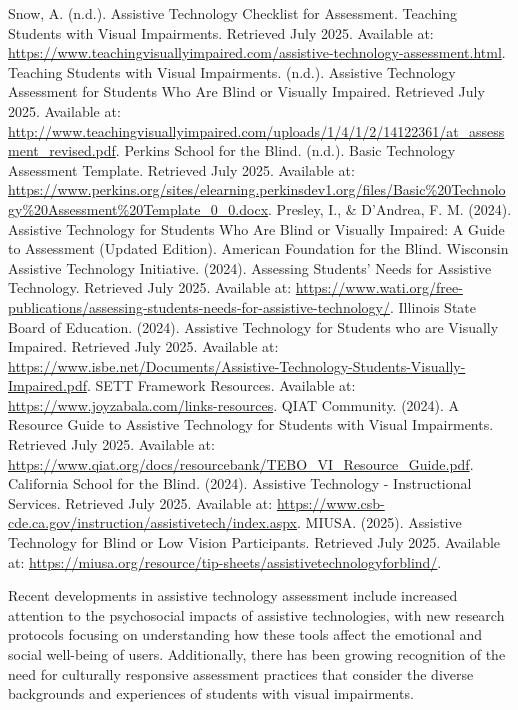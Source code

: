 \begin{thebibliography}{99}
 Snow, A. (n.d.). Assistive Technology Checklist for Assessment. Teaching Students with Visual Impairments. Retrieved July 2025. Available at: \url{https://www.teachingvisuallyimpaired.com/assistive-technology-assessment.html}.
 Teaching Students with Visual Impairments. (n.d.). Assistive Technology Assessment for Students Who Are Blind or Visually Impaired. Retrieved July 2025. Available at: \url{http://www.teachingvisuallyimpaired.com/uploads/1/4/1/2/14122361/at_assessment_revised.pdf}.
 Perkins School for the Blind. (n.d.). Basic Technology Assessment Template. Retrieved July 2025. Available at: \url{https://www.perkins.org/sites/elearning.perkinsdev1.org/files/Basic\%20Technology\%20Assessment\%20Template\_0\_0.docx}.
 Presley, I., \& D'Andrea, F. M. (2024). Assistive Technology for Students Who Are Blind or Visually Impaired: A Guide to Assessment (Updated Edition). American Foundation for the Blind.
 Wisconsin Assistive Technology Initiative. (2024). Assessing Students' Needs for Assistive Technology. Retrieved July 2025. Available at: \url{https://www.wati.org/free-publications/assessing-students-needs-for-assistive-technology/}.
 Illinois State Board of Education. (2024). Assistive Technology for Students who are Visually Impaired. Retrieved July 2025. Available at: \url{https://www.isbe.net/Documents/Assistive-Technology-Students-Visually-Impaired.pdf}.
 SETT Framework Resources. Available at: \url{https://www.joyzabala.com/links-resources}.
 QIAT Community. (2024). A Resource Guide to Assistive Technology for Students with Visual Impairments. Retrieved July 2025. Available at: \url{https://www.qiat.org/docs/resourcebank/TEBO_VI_Resource_Guide.pdf}.
 California School for the Blind. (2024). Assistive Technology - Instructional Services. Retrieved July 2025. Available at: \url{https://www.csb-cde.ca.gov/instruction/assistivetech/index.aspx}.
 MIUSA. (2025). Assistive Technology for Blind or Low Vision Participants. Retrieved July 2025. Available at: \url{https://miusa.org/resource/tip-sheets/assistivetechnologyforblind/}.
\end{thebibliography}

Recent developments in assistive technology assessment include increased attention to the psychosocial impacts of assistive technologies, with new research protocols focusing on understanding how these tools affect the emotional and social well-being of users. Additionally, there has been growing recognition of the need for culturally responsive assessment practices that consider the diverse backgrounds and experiences of students with visual impairments.


